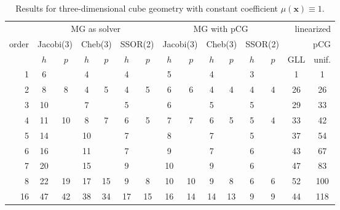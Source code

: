 \documentclass[smallcondensed,final]{svjour3}     %
\newcommand{\bs}[1]{\ensuremath{\boldsymbol #1}}
\begin{document}
\begin{table}
  \caption{\label{tab:3d-box} Results for three-dimensional cube geometry
    with constant coefficient $\mu(\bs x) \equiv 1$.}
  \centering
  \begin{tabular}{|r|c c|c c|c c||c c|c c|c c||c c|} 
    \hline
    & \multicolumn{6}{c||}{MG as solver} & \multicolumn{6}{c||}{MG with pCG} & \multicolumn{2}{r|}{linearized} \\
    \cline{2-13}
    \!\!\! order \!\!\!\! &  \multicolumn{2}{c|}{\!\scriptsize  Jacobi(3)\!} &  \multicolumn{2}{c|}{\!\scriptsize Cheb(3)\!} & \multicolumn{2}{c||}{\!\scriptsize  SSOR(2)\!} & \multicolumn{2}{c|}{\!\scriptsize Jacobi(3)\!} &  \multicolumn{2}{c|}{\!\scriptsize Cheb(3)\!} & \multicolumn{2}{c||}{\!\scriptsize SSOR(2)\!} & \multicolumn{2}{r|}{pCG}\\
\hline
 & $h$ & $p$ & $h$ & $p$& $h$ & $p$& $h$ & $p$& $h$ & $p$& $h$ & $p$& GLL & unif.\\
 \cline{2-15}
1 & 6 & & 4 & & 4 & & 5 & & 4 & & 3 & & 1 & 1  \\
2 & 8 & 8 & 4 & 5 & 4 & 5 & 6 & 6 & 4 & 4 & 4 & 4 & 26 & 26 \\
3 & 10 & & 7 & & 5 & & 6 & & 5 & & 5 & & 29 & 33  \\
4 & 11 & 10 & 8 & 7 & 6 & 5 & 7 & 7 & 6 & 5 & 5 & 4 & 33 & 42 \\
5 & 14 & & 10 & & 7 & & 8 & & 7 & & 5 & & 37 & 54  \\
6 & 16 & & 11 & & 7 & & 9 & & 7 & & 6 & & 43 & 67  \\
7 & 20 & & 15 & & 9 & & 10 & & 9 & & 6 & & 47 & 83  \\
8 & 22 & 19 & 17 & 15 & 9 & 8 & 10 & 10 & 9 & 8 & 6 & 6 & 52 & 100 \\
16 & 47 & 42 & 38 & 34 & 17 & 15 & 16 & 14 & 14 & 13 & 9 & 9 & 44 & 118 \\
\hline 
 \end{tabular}
\end{table}
\end{document}
